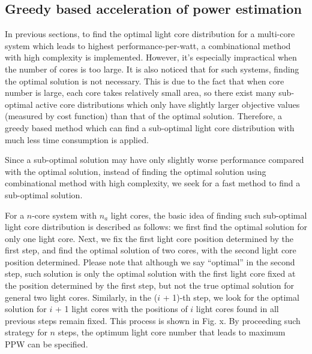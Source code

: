 \subsection{Greedy based acceleration of power estimation}
In previous sections, to find the optimal light core distribution for a multi-core system which leads to highest performance-per-watt, a combinational method with high complexity is implemented. However, it's  especially impractical when the number of cores is too large. It is also noticed that for such systems, finding the optimal solution is not necessary. This is due to the fact that when core number is large, each core takes relatively small area, so there exist many sub-optimal active core distributions which only have slightly larger objective values (measured by cost function) than that of the optimal solution. Therefore, a greedy based method which can find a sub-optimal light core distribution with much less time consumption is applied. 

Since a sub-optimal solution may have only slightly worse performance compared with the optimal solution, instead of finding the optimal solution using combinational method with high complexity, we seek for a fast method to find a sub-optimal solution.

For a $n$-core system with $n_{a}$ light cores, the basic idea of finding such sub-optimal light core distribution is described as follows: we first find the optimal solution for only one light core. Next, we fix the first light core position determined by the first step, and find the optimal solution of two cores, with the second light core position determined. Please note that although we say “optimal” in the second step, such solution is only the optimal solution with the first light core fixed at the position determined by the first step, but not the true optimal solution for general two light cores. Similarly, in the ($i$ + 1)-th step, we look for the optimal solution for $i$ + 1 light cores with the positions of $i$ light cores found in all previous steps remain fixed. This process is shown in Fig. x. By proceeding such strategy for $n$ steps, the optimum light core number that leads to maximum PPW can be specified.
